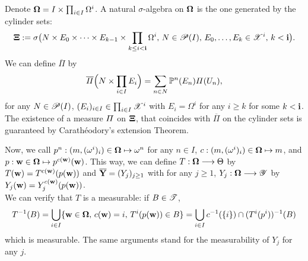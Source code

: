 Denote $\mathbf{\Omega}= I \times\prod_{i\in I}\Omega^i$. A natural $\sigma$-algebra on $\mathbf{\Omega}$ is the one generated by the cylinder sets:
\begin{equation}
    \mathbf{\Xi} := \sigma\big(N\times E_0\times\dots\times E_{k-1}\times\prod_{k\leq i<\mathbf{i}}\Omega^i,\,N\in\mathscr{P}(I),\, E_0,\dots,E_k\in\mathscr{X}^i,\,k<\mathbf{i} \big).
\end{equation}
We can define $\overline\varPi$ by
    \begin{equation}
        \overline\varPi\Big(N\times\prod_{i\in I}E_i\Big) = \sum_{n\in N}\mathbb{P}^n(E_n)\varPi(U_n),
    \end{equation}
for any $N\in\mathscr{P}(I)$, $(E_i)_{i \in I} \in\prod_{i\in I}\mathscr{X}^i$ with $E_i=\Omega^i$ for any $i\geq k$ for some $k<\mathbf{i}$. 
The existence of a measure $\mathbf{\varPi}$ on $\mathbf{\Xi}$, that coincides with $\overline\varPi$ on the cylinder sets is guaranteed by  Carathéodory's extension Theorem. %




Now, we call $p^n:(m,(\omega^i)_i)\in\mathbf{\Omega}\mapsto \omega^n$ for any $n\in I$, $c:(m,(\omega^i)_i)\in\mathbf{\Omega}\mapsto m$, and $p:\mathbf{w}\in\mathbf{\Omega}\mapsto p^{c(\mathbf{w})}(\mathbf{w})$.
This way, we can define $T:\mathbf{\Omega}\longrightarrow\Theta$ by $T(\mathbf{w})=T^{c(\mathbf{w})}(p(\mathbf{w}))$ and $\overline{\mathbf{Y}}=(Y_j)_{j\geq1}$ with for any $j\geq1$, $Y_j:\mathbf{\Omega}\longrightarrow\mathscr{Y}$ by $Y_j(\mathbf{w})=Y_j^{c(\mathbf{w})}(p(\mathbf{w}))$.\\
We can verify that $T$ is a measurable: if $B\in\mathscr{T}$,  
    \begin{equation}
        T^{-1}(B) = \bigcup_{i\in I}\{\mathbf{w}\in\mathbf{\Omega},\, c(\mathbf{w})=i,\,T^i(p(\mathbf{w}))\in B  \} = \bigcup_{i\in I}c^{-1}(\{i\})\cap (T^i(p^i))^{-1}(B)
    \end{equation}
which is measurable. 
The same arguments stand for the measurability of $Y_j$ for any $j$.




%



